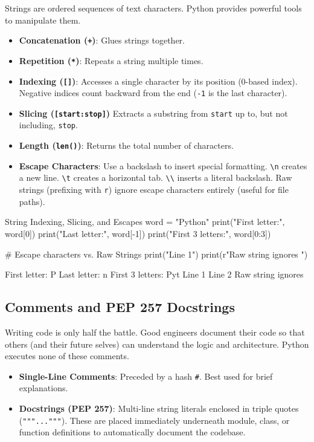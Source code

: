 Strings are ordered sequences of text characters. Python provides powerful tools to manipulate them.
\begin{itemize}[leftmargin=1.5em]
    \item \textbf{Concatenation (\texttt{+})}: Glues strings together.
    \item \textbf{Repetition (\texttt{*})}: Repeats a string multiple times.
    \item \textbf{Indexing (\texttt{[]})}: Accesses a single character by its position (0-based index). Negative indices count backward from the end (\texttt{-1} is the last character).
    \item \textbf{Slicing (\texttt{[start:stop]})} Extracts a substring from \texttt{start} up to, but not including, \texttt{stop}.
    \item \textbf{Length (\texttt{len()})}: Returns the total number of characters.
    \item \textbf{Escape Characters}: Use a backslash to insert special formatting. \texttt{\textbackslash n} creates a new line. \texttt{\textbackslash t} creates a horizontal tab. \texttt{\textbackslash \textbackslash} inserts a literal backslash. Raw strings (prefixing with \texttt{r}) ignore escape characters entirely (useful for file paths).
\end{itemize}

\begin{pythoncode}{String Indexing, Slicing, and Escapes}
word = "Python"
print("First letter:", word[0])
print("Last letter:", word[-1])
print("First 3 letters:", word[0:3])

# Escape characters vs. Raw Strings
print("Line 1")
print(r"Raw string ignores \n")
\end{pythoncode}

\begin{outputbox}
First letter: P
Last letter: n
First 3 letters: Pyt
Line 1
Line 2
Raw string ignores \n
\end{outputbox}

\subsection{Comments and PEP 257 Docstrings}

Writing code is only half the battle. Good engineers document their code so that others (and their future selves) can understand the logic and architecture. Python executes none of these comments.

\begin{itemize}[leftmargin=1.5em]
    \item \textbf{Single-Line Comments}: Preceded by a hash \texttt{\#}. Best used for brief explanations.
    \item \textbf{Docstrings (PEP 257)}: Multi-line string literals enclosed in triple quotes (\texttt{"""..."""}). These are placed immediately underneath module, class, or function definitions to automatically document the codebase.
\end{itemize}

